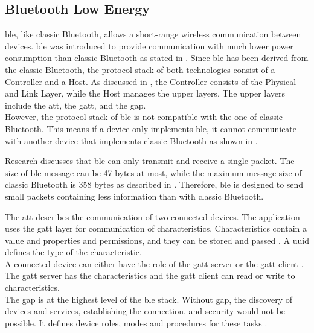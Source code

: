 \subsection{Bluetooth Low Energy}
\gls{ble}, like classic Bluetooth, allows a short-range wireless communication between devices. \gls{ble} was introduced to provide communication with much lower power consumption than classic Bluetooth as stated in \cite{GomezOP12}. Since \gls{ble} has been derived from the classic Bluetooth, the protocol stack of both technologies consist of a Controller and a Host. As discussed in \cite{GomezOP12}, the Controller consists of the Physical and Link Layer, while the Host manages the upper layers. The upper layers include the \gls{att}, the \gls{gatt}, and the \gls{gap}. \\
However, the protocol stack of \gls{ble} is not compatible with the one of classic Bluetooth. This means if a device only implements \gls{ble}, it cannot communicate with another device that implements classic Bluetooth as shown in \cite{GomezOP12}.

Research \cite{Ryan13} discusses that \gls{ble} can only transmit and receive a single packet. The size of \gls{ble} message can be 47 bytes at most, while the maximum message size of classic Bluetooth is 358 bytes as described in \cite{GomezOP12}. Therefore, \gls{ble} is designed to send small packets containing less information than with classic Bluetooth.

The \gls{att} describes the communication of two connected devices. The application uses the \gls{gatt} layer for communication of characteristics. Characteristics contain a value and properties and permissions, and they can be stored and passed \cite{BTGatt}. A \gls{uuid} defines the type of the characteristic. \\
A connected device can either have the role of the \gls{gatt} server or the \gls{gatt} client \cite{TIGatt}. The \gls{gatt} server has the characteristics and the \gls{gatt} client can read or write to characteristics. \\
The \gls{gap} is at the highest level of the \gls{ble} stack. Without \gls{gap}, the discovery of devices and services, establishing the connection, and security would not be possible. It defines device roles, modes and procedures for these tasks \cite{GomezOP12}.


